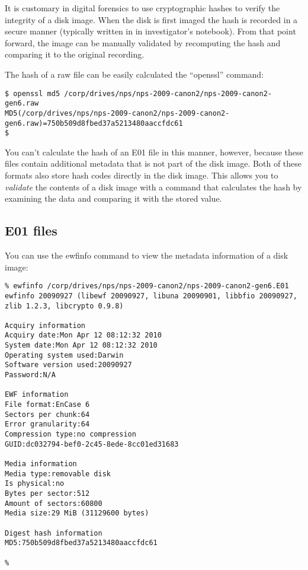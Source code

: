 It is customary in digital forensics to use cryptographic hashes to
verify the integrity of a disk image. When the disk is first imaged
the hash is recorded in a secure manner (typically written in in
investigator's notebook). From that point forward, the image can be
manually validated by recomputing the hash and comparing it to the
original recording.

The hash of a raw file can be easily calculated the ``openssl''
command:

\begin{Verbatim}
$ openssl md5 /corp/drives/nps/nps-2009-canon2/nps-2009-canon2-gen6.raw
MD5(/corp/drives/nps/nps-2009-canon2/nps-2009-canon2-gen6.raw)=750b509d8fbed37a5213480aaccfdc61
$ 
\end{Verbatim}

You can't calculate the hash of an E01 file in this manner,
however, because these files contain additional metadata that is not
part of the disk image.  Both of these formats also store hash codes
directly in the disk image. This allows you to \emph{validate} the
contents of a disk image with a command that calculates the hash by
examining the data and comparing it with the stored value. 

\subsection{E01 files}
You can use the ewfinfo command to view the metadata information of a
disk image:

\begin{Verbatim}
% ewfinfo /corp/drives/nps/nps-2009-canon2/nps-2009-canon2-gen6.E01 
ewfinfo 20090927 (libewf 20090927, libuna 20090901, libbfio 20090927, zlib 1.2.3, libcrypto 0.9.8)

Acquiry information
Acquiry date:Mon Apr 12 08:12:32 2010
System date:Mon Apr 12 08:12:32 2010
Operating system used:Darwin
Software version used:20090927
Password:N/A

EWF information
File format:EnCase 6
Sectors per chunk:64
Error granularity:64
Compression type:no compression
GUID:dc032794-bef0-2c45-8ede-8cc01ed31683

Media information
Media type:removable disk
Is physical:no
Bytes per sector:512
Amount of sectors:60800
Media size:29 MiB (31129600 bytes)

Digest hash information
MD5:750b509d8fbed37a5213480aaccfdc61

% 
\end{Verbatim}


